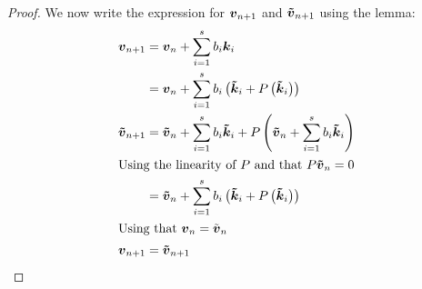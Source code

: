\begin{proof}
We now write the expression for ${\boldsymbol {v}}_{n+1}$ and ${\boldsymbol {\tilde{v}}}_{n+1}$ using the lemma:
\begin{align*}
{\boldsymbol {v}}_{n+1}&={\boldsymbol {v}}_{n}+\sum_{i=1}^{s}b_{i}{\boldsymbol {k}}_{i}\\
&={\boldsymbol {v}}_{n}+\sum_{i=1}^{s}b_{i}\left({\boldsymbol {\tilde{k}}}_{i}+P\left({\boldsymbol {\tilde{k}}}_{i}\right)\right)\\
{\boldsymbol {\tilde{v}}}_{n+1}&={\boldsymbol {\tilde{v}}}_{n}+\sum_{i=1}^{s}b_{i}{\boldsymbol {\tilde{k}}}_{i}+P\left({\boldsymbol {\tilde{v}}}_{n}+\sum_{i=1}^{s}b_{i}{\boldsymbol {\tilde{k}}}_{i}\right)\\
\intertext{Using the linearity of $P$ and that $P{\boldsymbol {\tilde{v}}}_{n}=0$}
&={\boldsymbol {\tilde{v}}}_{n}+\sum_{i=1}^{s}b_{i}\left({\boldsymbol {\tilde{k}}}_{i}+P\left({\boldsymbol {\tilde{k}}}_{i}\right)\right)\\
\intertext{Using that ${\boldsymbol {v}}_{n}=\tilde{{\boldsymbol {v}}}_{n}$}
{\boldsymbol {v}}_{n+1}&={\boldsymbol {\tilde{v}}}_{n+1}
\end{align*}

\end{proof}

